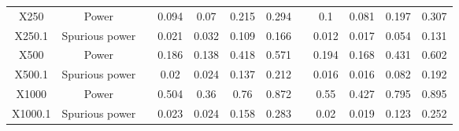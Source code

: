% 
\begin{tabular}{cccccccccccc}
  \hline
  \hline
X250 & Power &  & 0.094 & 0.07 & 0.215 & 0.294 &  & 0.1 & 0.081 & 0.197 & 0.307 \\ 
  X250.1 & Spurious power &  & 0.021 & 0.032 & 0.109 & 0.166 &  & 0.012 & 0.017 & 0.054 & 0.131 \\ 
  X500 & Power &  & 0.186 & 0.138 & 0.418 & 0.571 &  & 0.194 & 0.168 & 0.431 & 0.602 \\ 
  X500.1 & Spurious power &  & 0.02 & 0.024 & 0.137 & 0.212 &  & 0.016 & 0.016 & 0.082 & 0.192 \\ 
  X1000 & Power &  & 0.504 & 0.36 & 0.76 & 0.872 &  & 0.55 & 0.427 & 0.795 & 0.895 \\ 
  X1000.1 & Spurious power &  & 0.023 & 0.024 & 0.158 & 0.283 &  & 0.02 & 0.019 & 0.123 & 0.252 \\ 
   \hline
\end{tabular}
